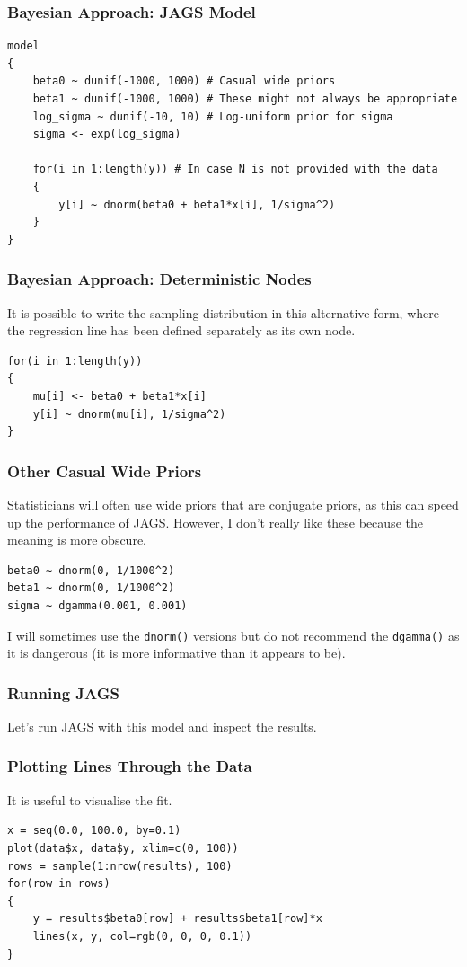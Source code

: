 \documentclass{beamer}
\begin{document}
\begin{frame}[fragile]
\frametitle{Bayesian Approach: JAGS Model}

\footnotesize
\begin{verbatim}
model
{
    beta0 ~ dunif(-1000, 1000) # Casual wide priors
    beta1 ~ dunif(-1000, 1000) # These might not always be appropriate
    log_sigma ~ dunif(-10, 10) # Log-uniform prior for sigma
    sigma <- exp(log_sigma)

    for(i in 1:length(y)) # In case N is not provided with the data
    {
        y[i] ~ dnorm(beta0 + beta1*x[i], 1/sigma^2)
    }
}
\end{verbatim}

\end{frame}

\begin{frame}[fragile]
\frametitle{Bayesian Approach: Deterministic Nodes}
It is possible to write the sampling distribution in this alternative form,
where the regression line has been defined separately as its own node.
\begin{verbatim}
for(i in 1:length(y))
{
    mu[i] <- beta0 + beta1*x[i]
    y[i] ~ dnorm(mu[i], 1/sigma^2)
}
\end{verbatim}


\end{frame}


\begin{frame}[fragile]
\frametitle{Other Casual Wide Priors}
Statisticians will often use wide priors that are conjugate priors, as this
can speed up the performance of JAGS. However, I don't really like these
because the meaning is more obscure.
\begin{verbatim}
beta0 ~ dnorm(0, 1/1000^2)
beta1 ~ dnorm(0, 1/1000^2)
sigma ~ dgamma(0.001, 0.001)
\end{verbatim}

I will sometimes use the \texttt{dnorm()} versions but do not recommend
the \texttt{dgamma()} as it is dangerous (it is more informative than
it appears to be).
\end{frame}


\begin{frame}[fragile]
\frametitle{Running JAGS}
\large
Let's run JAGS with this model and inspect the results.
\end{frame}


\begin{frame}[fragile]
\frametitle{Plotting Lines Through the Data}
It is useful to visualise the fit.
\begin{verbatim}
x = seq(0.0, 100.0, by=0.1)
plot(data$x, data$y, xlim=c(0, 100))
rows = sample(1:nrow(results), 100)
for(row in rows)
{
    y = results$beta0[row] + results$beta1[row]*x
    lines(x, y, col=rgb(0, 0, 0, 0.1))
}
\end{verbatim}

\end{frame}
\end{document}
